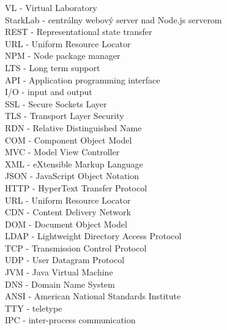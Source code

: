 VL - Virtual Laboratory\\
StarkLab - centrálny webový server nad Node.js serverom\\
REST - Representational state transfer\\
URL - Uniform Resource Locator\\
NPM - Node package manager\\
LTS - Long term support\\
API - Application programming interface\\
I/O - input and output\\
SSL - Secure Sockets Layer\\
TLS - Transport Layer Security\\
RDN - Relative Distinguished Name\\
COM - Component Object Model\\
MVC - Model View Controller\\
XML - eXtensible Markup Language\\
JSON - JavaScript Object Notation\\
HTTP - HyperText Transfer Protocol\\
URL - Uniform Resource Locator\\
CDN - Content Delivery Network\\
DOM - Document Object Model\\
LDAP - Lightweight Directory Access Protocol\\
TCP - Transmission Control Protocol\\
UDP - User Datagram Protocol\\
JVM - Java Virtual Machine\\
DNS - Domain Name System\\
ANSI - American National Standards Institute\\
TTY - teletype\\
IPC - inter-process communication\\

